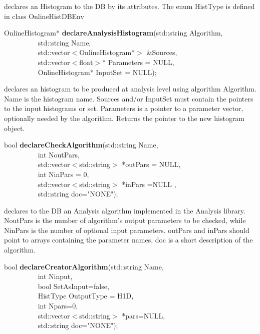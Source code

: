  declares an Histogram to the DB by its attributes.  The enum HistType is defined in class OnlineHistDBEnv


\item    OnlineHistogram* {\bf declareAnalysisHistogram}(std::string Algorithm,\\\mbox{}~~~~~~~~~
                                            std::string Name,\\\mbox{}~~~~~~~~~
                                            std::vector$<$OnlineHistogram*$>$ \&Sources,\\\mbox{}~~~~~~~~~
                                            std::vector$<$float$>$* Parameters = NULL,\\\mbox{}~~~~~~~~~
                                            OnlineHistogram* InputSet = NULL);

 declares an histogram to be produced at analysis
 level using algorithm Algorithm. Name is the histogram name. Sources
 and/or InputSet must contain the pointers to the input histograms or set. 
 Parameters is a
 pointer to a parameter vector, optionally needed by the algorithm. 
 Returns the pointer to the new histogram object.


\item    bool {\bf declareCheckAlgorithm}(std::string Name,\\\mbox{}~~~~~~~~~ 
                             int NoutPars,\\\mbox{}~~~~~~~~~ 
                             std::vector$<$std::string$>$ *outPars = NULL,\\\mbox{}~~~~~~~~~
                             int NinPars = 0,\\\mbox{}~~~~~~~~~ 
                             std::vector$<$std::string$>$ *inPars =NULL ,\\\mbox{}~~~~~~~~~
                             std::string doc="NONE");

 declares to the DB an Analysis algorithm implemented in the Analysis
 library. NoutPars is the number of algorithm's output parameters to be checked, 
 while NinPars is the number of optional input parameters.
 outPars and inPars should point to arrays containing the parameter names, 
 doc is a short description of the algorithm.


\item    bool {\bf declareCreatorAlgorithm}(std::string Name,\\\mbox{}~~~~~~~~~ 
			       int Ninput,\\\mbox{}~~~~~~~~~
             bool SetAsInput=false,\\\mbox{}~~~~~~~~~
			       HistType OutputType = H1D,\\\mbox{}~~~~~~~~~
			       int Npars=0,\\\mbox{}~~~~~~~~~ 
			       std::vector$<$std::string$>$ *pars=NULL,\\\mbox{}~~~~~~~~~
			       std::string doc="NONE");

